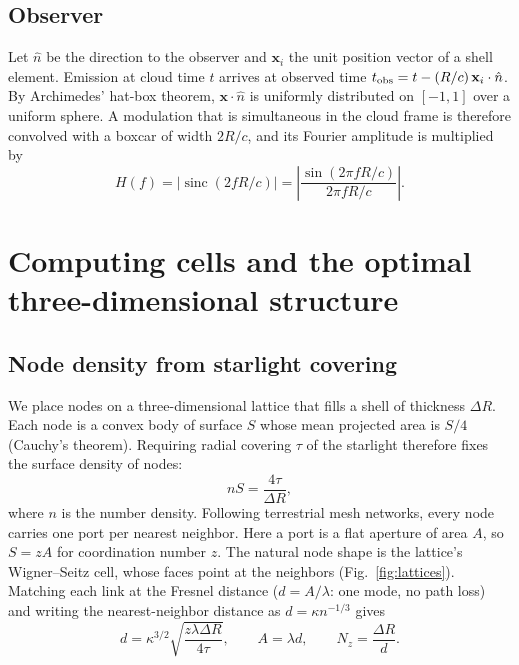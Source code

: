 \documentclass[final,5p]{elsarticle}
\begin{document}
\subsection{Observer}
Let $\hat n$ be the direction to the observer and $\mathbf{x}_i$ the unit position vector of a shell element. Emission at cloud time $t$ arrives at observed time $t_{\rm obs} = t - (R/c)\,\mathbf{x}_i\cdot\hat n$. By Archimedes' hat-box theorem, $\mathbf{x}\cdot\hat n$ is uniformly distributed on $[-1,1]$ over a uniform sphere. A modulation that is simultaneous in the cloud frame is therefore convolved with a boxcar of width $2R/c$, and its Fourier amplitude is multiplied by
\begin{equation}
H(f) = \left|\operatorname{sinc}\!\left(2fR/c\right)\right| = \left|\frac{\sin(2\pi fR/c)}{2\pi fR/c}\right|.
\label{eq:transfer}
\end{equation}

\section{Computing cells and the optimal three-dimensional structure}\label{sec:cells}

\subsection{Node density from starlight covering}
We place nodes on a three-dimensional lattice that fills a shell of thickness $\Delta R$. Each node is a convex body of surface $S$ whose mean projected area is $S/4$ (Cauchy's theorem). Requiring radial covering $\tau$ of the starlight therefore fixes the surface density of nodes:
\begin{equation}
nS = \frac{4\tau}{\Delta R},
\end{equation}
where $n$ is the number density. Following terrestrial mesh networks, every node carries one port per nearest neighbor. Here a port is a flat aperture of area $A$, so $S=zA$ for coordination number $z$. The natural node shape is the lattice's Wigner--Seitz cell, whose faces point at the neighbors (Fig.~\ref{fig:lattices}). Matching each link at the Fresnel distance ($d=A/\lambda$: one mode, no path loss) and writing the nearest-neighbor distance as $d=\kappa n^{-1/3}$ gives
\begin{equation}
d = \kappa^{3/2}\sqrt{\frac{z\lambda\Delta R}{4\tau}},\qquad A=\lambda d,\qquad N_z=\frac{\Delta R}{d}.
\label{eq:spacing}
\end{equation}
\end{document}
